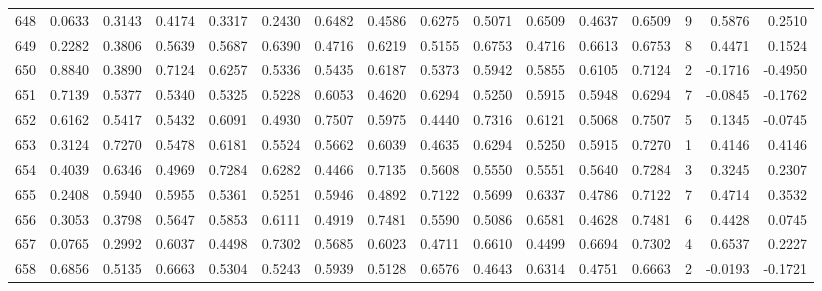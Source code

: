 \begin{tabular}{lrrrrrrrrrrrrrrr}
648 &      0.0633 &  0.3143 &  0.4174 &  0.3317 &  0.2430 &  0.6482 &  0.4586 &  0.6275 &  0.5071 &  0.6509 &   0.4637 &     0.6509 &      9 &                    0.5876 &                     0.2510 \\
649 &      0.2282 &  0.3806 &  0.5639 &  0.5687 &  0.6390 &  0.4716 &  0.6219 &  0.5155 &  0.6753 &  0.4716 &   0.6613 &     0.6753 &      8 &                    0.4471 &                     0.1524 \\
650 &      0.8840 &  0.3890 &  0.7124 &  0.6257 &  0.5336 &  0.5435 &  0.6187 &  0.5373 &  0.5942 &  0.5855 &   0.6105 &     0.7124 &      2 &                   -0.1716 &                    -0.4950 \\
651 &      0.7139 &  0.5377 &  0.5340 &  0.5325 &  0.5228 &  0.6053 &  0.4620 &  0.6294 &  0.5250 &  0.5915 &   0.5948 &     0.6294 &      7 &                   -0.0845 &                    -0.1762 \\
652 &      0.6162 &  0.5417 &  0.5432 &  0.6091 &  0.4930 &  0.7507 &  0.5975 &  0.4440 &  0.7316 &  0.6121 &   0.5068 &     0.7507 &      5 &                    0.1345 &                    -0.0745 \\
653 &      0.3124 &  0.7270 &  0.5478 &  0.6181 &  0.5524 &  0.5662 &  0.6039 &  0.4635 &  0.6294 &  0.5250 &   0.5915 &     0.7270 &      1 &                    0.4146 &                     0.4146 \\
654 &      0.4039 &  0.6346 &  0.4969 &  0.7284 &  0.6282 &  0.4466 &  0.7135 &  0.5608 &  0.5550 &  0.5551 &   0.5640 &     0.7284 &      3 &                    0.3245 &                     0.2307 \\
655 &      0.2408 &  0.5940 &  0.5955 &  0.5361 &  0.5251 &  0.5946 &  0.4892 &  0.7122 &  0.5699 &  0.6337 &   0.4786 &     0.7122 &      7 &                    0.4714 &                     0.3532 \\
656 &      0.3053 &  0.3798 &  0.5647 &  0.5853 &  0.6111 &  0.4919 &  0.7481 &  0.5590 &  0.5086 &  0.6581 &   0.4628 &     0.7481 &      6 &                    0.4428 &                     0.0745 \\
657 &      0.0765 &  0.2992 &  0.6037 &  0.4498 &  0.7302 &  0.5685 &  0.6023 &  0.4711 &  0.6610 &  0.4499 &   0.6694 &     0.7302 &      4 &                    0.6537 &                     0.2227 \\
658 &      0.6856 &  0.5135 &  0.6663 &  0.5304 &  0.5243 &  0.5939 &  0.5128 &  0.6576 &  0.4643 &  0.6314 &   0.4751 &     0.6663 &      2 &                   -0.0193 &                    -0.1721 \\

\end{tabular}

